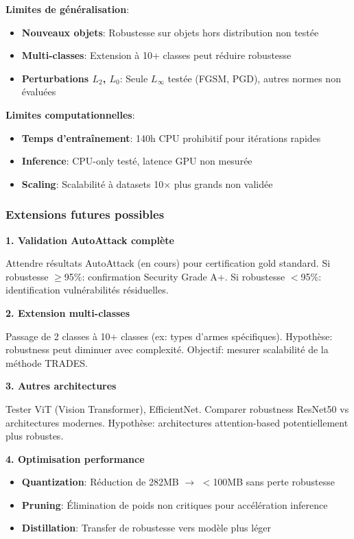 \textbf{Limites de généralisation}:

\begin{itemize}
    \item \textbf{Nouveaux objets}: Robustesse sur objets hors distribution non testée
    \item \textbf{Multi-classes}: Extension à 10+ classes peut réduire robustesse
    \item \textbf{Perturbations $L_2$, $L_0$}: Seule $L_\infty$ testée (FGSM, PGD), autres normes non évaluées
\end{itemize}

\textbf{Limites computationnelles}:

\begin{itemize}
    \item \textbf{Temps d'entraînement}: 140h CPU prohibitif pour itérations rapides
    \item \textbf{Inference}: CPU-only testé, latence GPU non mesurée
    \item \textbf{Scaling}: Scalabilité à datasets 10$\times$ plus grands non validée
\end{itemize}

\subsubsection{Extensions futures possibles}

\textbf{1. Validation AutoAttack complète}

Attendre résultats AutoAttack (en cours) pour certification gold standard. Si robustesse $\geq$95\%: confirmation Security Grade A+. Si robustesse $<$95\%: identification vulnérabilités résiduelles.

\textbf{2. Extension multi-classes}

Passage de 2 classes à 10+ classes (ex: types d'armes spécifiques). Hypothèse: robustness peut diminuer avec complexité. Objectif: mesurer scalabilité de la méthode TRADES.

\textbf{3. Autres architectures}

Tester ViT (Vision Transformer), EfficientNet. Comparer robustness ResNet50 vs architectures modernes. Hypothèse: architectures attention-based potentiellement plus robustes.

\textbf{4. Optimisation performance}

\begin{itemize}
    \item \textbf{Quantization}: Réduction de 282MB $\rightarrow$ $<$100MB sans perte robustesse
    \item \textbf{Pruning}: Élimination de poids non critiques pour accélération inference
    \item \textbf{Distillation}: Transfer de robustesse vers modèle plus léger
\end{itemize}

